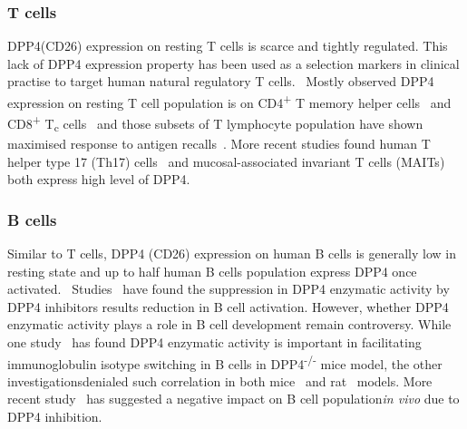 \subsubsection{T cells}
DPP4(CD26) expression on resting T cells is scarce and tightly regulated. This lack of DPP4 expression property has been used as a selection markers in clinical practise to target human natural regulatory T cells.~\cite{Salgado2012,Garcia2014} Mostly observed DPP4 expression on resting T cell population is on CD4\textsuperscript{+} T memory helper cells~\cite{Gorrell1991, Morimoto1998} and CD8\textsuperscript{+} T\textsubscript{c} cells~\cite{Waumans2015,Hatano2013} and those subsets of T lymphocyte population have shown maximised response to antigen recalls~\cite{Waumans2015,Morimoto1998,Hatano2013}. More recent studies found human T helper type 17 (Th17) cells~\cite{Bengsch2012} and mucosal-associated invariant T cells (MAITs)~\cite{Sharma2015} both express high level of DPP4.

\subsubsection{B cells}
Similar to T cells, DPP4 (CD26) expression on human B cells is generally low in resting state and up to half human B cells population express DPP4 once activated.~\cite{B_hling_1995} Studies~\cite{B_hling_1995,Micouin1997} have found the suppression in DPP4 enzymatic activity by DPP4 inhibitors results reduction in B cell activation. However, whether DPP4 enzymatic activity plays a role in B cell development remain controversy. While one study~\cite{Yan2003} has found DPP4 enzymatic activity is important in facilitating immunoglobulin isotype switching in B cells in DPP4\textsuperscript{-/-} mice model, the other investigationsdenialed such correlation in both mice~\cite{Vora2009} and rat~\cite{Coburn1994} models. More recent study~\cite{Klemann2009} has suggested a negative impact on B cell population\textit{in vivo} due to DPP4 inhibition.  
